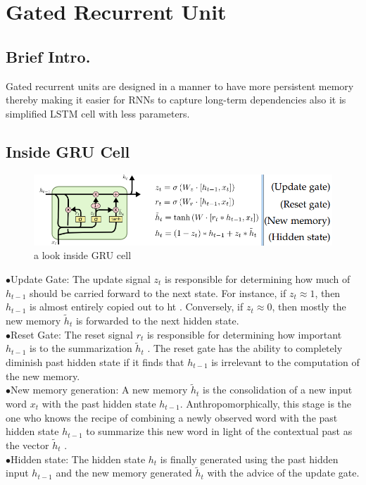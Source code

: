 \section{Gated Recurrent Unit}
\label{chap:Gated Recurrent Unit}

\subsection{Brief Intro.}
Gated recurrent units are designed in a
manner to have more persistent memory thereby making it easier for
RNNs to capture long-term dependencies also it is simplified  LSTM cell with less parameters.
\subsection{Inside GRU Cell}
\begin{figure}[H]%
    \center%
    \includegraphics[width=\textwidth]{images/amir/Capture1.png}%
    \caption[This is gru-inside image]{a look inside GRU cell}\label{fig:gru inside}%
  \end{figure}
\indent$\bullet$Update Gate: The update signal $z_t$
is responsible for determining
how much of $h_{t-1}$ should be carried forward to the next state. For
instance, if $z_{t} \approx 1$, then  $h_{t-1}$ is almost entirely copied out to ht
.
Conversely, if $z_{t} \approx 0$, then mostly the new memory $\tilde{h}_{t}$ 
is forwarded
to the next hidden state.\\
\indent$\bullet$Reset Gate: The reset signal $r_t$
is responsible for determining how
important $h_{t-1}$ is to the summarization $\tilde{h}_{t}$
. The reset gate has the
ability to completely diminish past hidden state if it finds that $h_{t-1}$
is irrelevant to the computation of the new memory.\\
\indent$\bullet$New memory generation: A new memory $\tilde{h}_{t}$
is the consolidation of
a new input word $x_t$ with the past hidden state $h_{t-1}$. Anthropomorphically,
this stage is the one who knows the recipe of combining a
newly observed word with the past hidden state $h_{t-1}$ to summarize
this new word in light of the contextual past as the vector $\tilde{h}_{t}$ .\\
\indent$\bullet$Hidden state: The hidden state $h_t$
is finally generated using the
past hidden input $h_{t-1}$ and the new memory generated $\tilde{h}_{t}$ with the
advice of the update gate.\\
